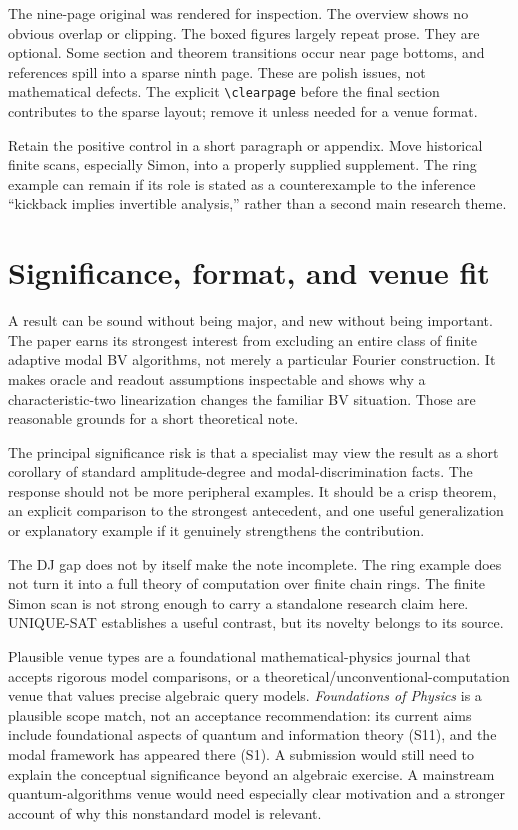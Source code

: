 \documentclass[
  11pt,
]{article}
\begin{document}
The nine-page original was rendered for inspection. The overview shows
no obvious overlap or clipping. The boxed figures largely repeat prose.
They are optional. Some section and theorem transitions occur near page
bottoms, and references spill into a sparse ninth page. These are polish
issues, not mathematical defects. The explicit
\texttt{\textbackslash{}clearpage} before the final section contributes
to the sparse layout; remove it unless needed for a venue format.

Retain the positive control in a short paragraph or appendix. Move
historical finite scans, especially Simon, into a properly supplied
supplement. The ring example can remain if its role is stated as a
counterexample to the inference ``kickback implies invertible
analysis,'' rather than a second main research theme.

\section{Significance, format, and venue
fit}\label{significance-format-and-venue-fit}

A result can be sound without being major, and new without being
important. The paper earns its strongest interest from excluding an
entire class of finite adaptive modal BV algorithms, not merely a
particular Fourier construction. It makes oracle and readout assumptions
inspectable and shows why a characteristic-two linearization changes the
familiar BV situation. Those are reasonable grounds for a short
theoretical note.

The principal significance risk is that a specialist may view the result
as a short corollary of standard amplitude-degree and
modal-discrimination facts. The response should not be more peripheral
examples. It should be a crisp theorem, an explicit comparison to the
strongest antecedent, and one useful generalization or explanatory
example if it genuinely strengthens the contribution.

The DJ gap does not by itself make the note incomplete. The ring example
does not turn it into a full theory of computation over finite chain
rings. The finite Simon scan is not strong enough to carry a standalone
research claim here. UNIQUE-SAT establishes a useful contrast, but its
novelty belongs to its source.

Plausible venue types are a foundational mathematical-physics journal
that accepts rigorous model comparisons, or a
theoretical/unconventional-computation venue that values precise
algebraic query models. \emph{Foundations of Physics} is a plausible
scope match, not an acceptance recommendation: its current aims include
foundational aspects of quantum and information theory (S11), and the
modal framework has appeared there (S1). A submission would still need
to explain the conceptual significance beyond an algebraic exercise. A
mainstream quantum-algorithms venue would need especially clear
motivation and a stronger account of why this nonstandard model is
relevant.
\end{document}
